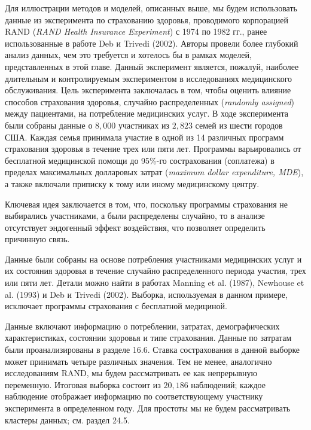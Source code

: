\noindent
Для иллюстрации методов и моделей, описанных выше, мы будем использовать данные из эксперимента по страхованию здоровья, проводимого корпорацией RAND (\textit{RAND Health Insurance Experiment}) с 1974 по 1982 гг., ранее использованные в работе Deb и Trivedi (2002). Авторы провели более глубокий анализ данных, чем это требуется и хотелось бы в рамках моделей, представленных в этой главе. Данный эксперимент является, пожалуй, наиболее длительным и контролируемым экспериментом в исследованиях медицинского обслуживания. Цель эксперимента заключалась в том, чтобы оценить влияние способов страхования здоровья, случайно распределенных (\textit{randomly assigned}) между пациентами, на потребление медицинских услуг.
В ходе эксперимента были собраны данные о $8,000$ участниках из $2,823$ семей из шести городов США. Каждая семья принимала участие в одной из 14 различных программ страхования здоровья в течение трех или пяти лет. Программы варьировались от бесплатной медицинской помощи до 95\%-го сострахования (соплатежа) в пределах максимальных долларовых затрат (\textit{maximum dollar expenditure, MDE}), а также включали приписку к тому или иному медицинскому центру.

Ключевая идея заключается в том, что, поскольку программы страхования не выбирались участниками, а были распределены случайно, то в анализе отсутствует эндогенный эффект воздействия, что позволяет определить причинную связь.

Данные были собраны на основе потребления участниками медицинских услуг и их состояния здоровья в течение случайно распределенного периода участия, трех или пяти лет. Детали можно найти в работах Manning et al. (1987), Newhouse et al. (1993) и Deb и Trivedi (2002). Выборка, используемая в данном примере, исключает программы страхования с бесплатной медициной.

Данные включают информацию о потреблении, затратах, демографических характеристиках, состоянии здоровья и типе страхования. Данные по затратам были проанализированы в разделе 16.6. %
Ставка сострахования в данной выборке может принимать четыре различных значения. Тем не менее, аналогично исследованиям RAND, мы будем рассматривать ее как непрерывную переменную. Итоговая выборка состоит из $20,186$ наблюдений; каждое наблюдение отображает информацию по соответствующему участнику эксперимента в определенном году. Для простоты мы не будем рассматривать кластеры данных; см. раздел
24.5. %

